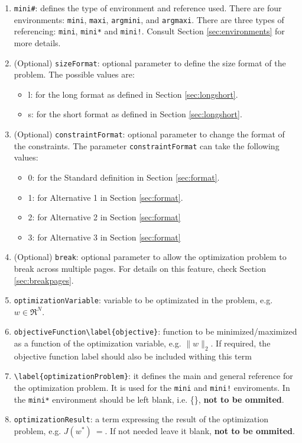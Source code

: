 \documentclass[a4paper]{article}
\begin{document}
\begin{enumerate}[label=(\roman*)]
	\item \verb|mini#|: defines the type of environment and reference used. There are four environments: \verb|mini|, \verb|maxi|, \verb|argmini|, and \verb|argmaxi|. There are three types of referencing: \verb|mini|, \verb|mini*| and \verb|mini!|. Consult Section \ref{sec:environments} for more details. 
	\item (Optional) \verb|sizeFormat|: optional parameter to define the size format of the problem. The possible values are:
	\begin{itemize}
		\item l: for the long format as defined in Section \ref{sec:longshort}.
		\item s: for the short format as defined in Section \ref{sec:longshort}.
	\end{itemize}	
	\item (Optional) \verb|constraintFormat|: optional parameter to change the format of the constraints. The parameter \verb|constraintFormat| can take the following values: 
	\begin{itemize}
	\item 0: for the Standard definition in Section \ref{sec:format}.
	\item 1: for Alternative 1 in Section \ref{sec:format}.
	\item 2: for Alternative 2 in Section \ref{sec:format}
	\item 3: for Alternative 3 in Section \ref{sec:format}		
	\end{itemize}
	\item (Optional) \verb|break|: optional parameter to allow the optimization problem to break across multiple pages. For details on this feature, check Section \ref{sec:breakpages}.
	\item \verb|optimizationVariable|: variable to be optimizated in the problem, e.g. $w \in \Re^N$.
	\item \verb|objectiveFunction\label{objective}|: function to be minimized/maximized as a function of the optimization variable, e.g. $\|w\|_2$. If required, the objective function label should also be included withing this term
	\item \verb|\label{optimizationProblem}|: it defines the main and general reference for the optimization problem. It is used for the \verb|mini| and \verb|mini!| enviroments. In the \verb|mini*| environment should be left blank, i.e. \{\}, \textbf{not to be ommited}.
	\item \verb|optimizationResult|: a term expressing the result of the optimization problem, e.g. $J(w^*)~=$. If not needed leave it blank, \textbf{not to be ommited}.
\end{enumerate}
\end{document}
